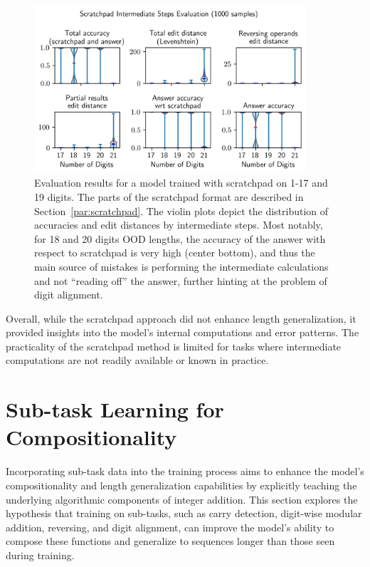 \begin{figure}[!h]
    \centering
    \includegraphics[width=0.9\textwidth]{fig/scratchpad_eval.png}
    \caption{Evaluation results for a model trained with scratchpad on 1-17 and 19 digits. The parts of the scratchpad format are described in Section~\ref{par:scratchpad}. The violin plots depict the distribution of accuracies and edit distances by intermediate steps. Most notably, for 18 and 20 digits OOD lengths, the accuracy of the answer with respect to scratchpad is very high (center bottom), and thus the main source of mistakes is performing the intermediate calculations and not ``reading off'' the answer, further hinting at the problem of digit alignment.}
    \label{fig:scratchpad_eval}
\end{figure}

Overall, while the scratchpad approach did not enhance length generalization, it provided insights into the model's internal computations and error patterns. The practicality of the scratchpad method is limited for tasks where intermediate computations are not readily available or known in practice.

\section{Sub-task Learning for Compositionality}\label{sec:subtask_learning}

Incorporating sub-task data into the training process aims to enhance the model's compositionality and length generalization capabilities by explicitly teaching the underlying algorithmic components of integer addition. This section explores the hypothesis that training on sub-tasks, such as carry detection, digit-wise modular addition, reversing, and digit alignment, can improve the model's ability to compose these functions and generalize to sequences longer than those seen during training.

